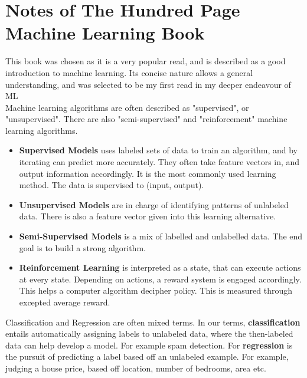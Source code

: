 \section{Notes of The Hundred Page Machine Learning Book}
\label{section:100PageNotes}

This book was chosen as it is a very popular read, and is described as a good introduction to machine learning. Its concise nature allows a general understanding, and was selected to be my first read in my deeper endeavour of ML\\

Machine learning algorithms are often described as "supervised", or "unsupervised". There are also "semi-supervised" and "reinforcement" machine learning algorithms.\\
\newpage
\begin{itemize}
	\item \textbf{Supervised Models} uses labeled sets of data to train an algorithm, and by iterating can predict more accurately. They often take feature vectors in, and output information accordingly. It is the most commonly used learning method.  The data is supervised to (input, output). \\
	\item \textbf{Unsupervised Models} are in charge of identifying patterns of unlabeled data. There is also a feature vector given into this learning alternative. \\
	\item \textbf{Semi-Supervised Models} is a mix of labelled and unlabelled data. The end goal is to build a strong algorithm. \\
	\item \textbf{Reinforcement Learning} is interpreted as a state, that can execute actions at every state. Depending on actions, a reward system is engaged accordingly. This helps a computer algorithm decipher policy. This is measured through excepted average reward. \\
\end{itemize}

Classification and Regression are often mixed terms. In our terms, \textbf{classification} entails automatically assigning labels to unlabeled data, where the then-labeled data can help develop a model. For example spam detection. For \textbf{regression} is the pursuit of predicting a label based off an unlabeled example. For example, judging a house price, based off location, number of bedrooms, area etc. \\

